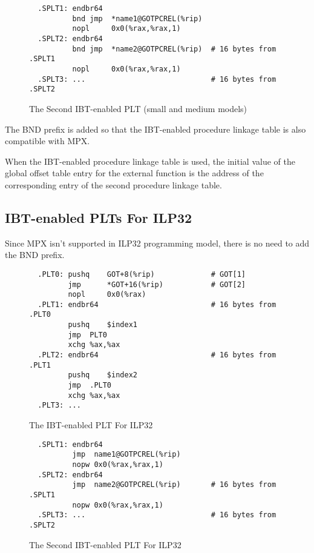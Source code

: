 \begin{figure}[H]
\Hrule
\caption{The Second IBT-enabled PLT (small and medium models)}
\label{ibt_sec_small_med_plt}
\begin{footnotesize}
\begin{verbatim}
  .SPLT1: endbr64
          bnd jmp  *name1@GOTPCREL(%rip)
          nopl     0x0(%rax,%rax,1)
  .SPLT2: endbr64
          bnd jmp  *name2@GOTPCREL(%rip)  # 16 bytes from .SPLT1
          nopl     0x0(%rax,%rax,1)
  .SPLT3: ...                             # 16 bytes from .SPLT2
\end{verbatim}%
\end{footnotesize}
\Hrule
\end{figure}

The BND prefix is added so that the IBT-enabled procedure linkage table is
also compatible with MPX.

When the IBT-enabled procedure linkage table is used, the initial value of
the global offset table entry for the external function is the address of
the corresponding entry of the second procedure linkage table.

\subsection{IBT-enabled PLTs For ILP32}

Since MPX isn't supported in ILP32 programming model, there is no
need to add the BND prefix.

\begin{figure}[H]
\Hrule
\caption{The IBT-enabled PLT For ILP32}
\label{ibt_small_med_plt_ipl32}
\begin{footnotesize}
\begin{verbatim}
  .PLT0: pushq    GOT+8(%rip)             # GOT[1]
         jmp      *GOT+16(%rip)           # GOT[2]
         nopl     0x0(%rax)
  .PLT1: endbr64                          # 16 bytes from .PLT0
         pushq    $index1
         jmp  PLT0
         xchg %ax,%ax
  .PLT2: endbr64                          # 16 bytes from .PLT1
         pushq    $index2
         jmp  .PLT0
         xchg %ax,%ax
  .PLT3: ...
\end{verbatim}%
\end{footnotesize}
\Hrule
\end{figure}

\begin{figure}[H]
\Hrule
\caption{The Second IBT-enabled PLT For ILP32}
\label{ibt_sec_small_med_plt_ipl32}
\begin{footnotesize}
\begin{verbatim}
  .SPLT1: endbr64
          jmp  name1@GOTPCREL(%rip)
          nopw 0x0(%rax,%rax,1)
  .SPLT2: endbr64
          jmp  name2@GOTPCREL(%rip)       # 16 bytes from .SPLT1
          nopw 0x0(%rax,%rax,1)
  .SPLT3: ...                             # 16 bytes from .SPLT2
\end{verbatim}%
\end{footnotesize}
\Hrule
\end{figure}

